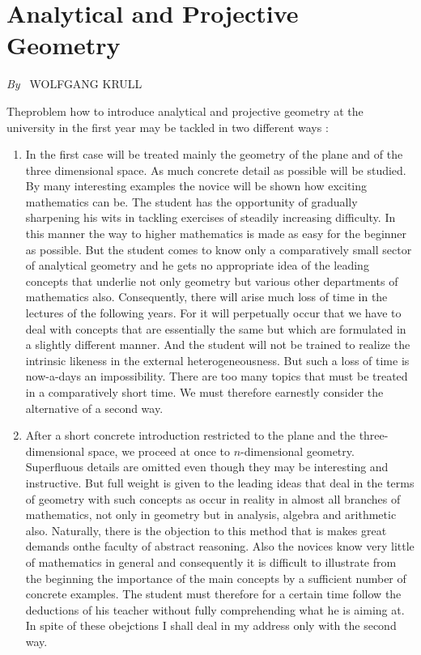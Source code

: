
\chapter{Analytical and Projective Geometry}

\begin{center}
{\em By~} WOLFGANG KRULL
\end{center}

The\pageoriginale problem how to introduce analytical and projective
geometry at the university in the first year may be tackled in two
different ways :
\begin{enumerate}
\item In the first case will be treated mainly the geometry of the
  plane and of the three dimensional space. As much concrete detail as
  possible will be studied. By many interesting examples the novice
  will be shown how exciting mathematics can be. The student has the
  opportunity of gradually sharpening his wits in tackling exercises
  of steadily increasing difficulty. In this manner the way to higher
  mathematics is made as easy for the beginner as possible. But the
  student comes to know only a comparatively small sector of
  analytical geometry and he gets no appropriate idea of the leading
  concepts that underlie not only geometry but various other
  departments of mathematics also. Consequently, there will arise much
  loss of time in the lectures of the following years. For it will
  perpetually occur that we have to deal with concepts that are
  essentially the same but which are formulated in a slightly
  different manner. And the student will not be trained to realize the
  intrinsic likeness in the external heterogeneousness. But such a
  loss of time is now-a-days an impossibility. There are too many
  topics that must be treated in a comparatively short time. We must
  therefore earnestly consider the alternative of a second way.

\item After a short concrete introduction restricted to the plane and
  the three-dimensional space, we proceed at once to $n$-dimensional
  geometry. Superfluous details are omitted even though they may be
  interesting and instructive. But full weight is given to the leading
  ideas that deal in the terms of geometry with such concepts as occur
  in reality in almost all branches of mathematics, not only in
  geometry but in analysis, algebra and arithmetic also. Naturally,
  there is the objection to this method that is makes great demands
  on\pageoriginale the faculty of abstract reasoning. Also the novices
  know very little of mathematics in general and consequently it is
  difficult to illustrate from the beginning the importance of the
  main concepts by a sufficient number of concrete examples. The
  student must therefore for a certain time follow the deductions of
  his teacher without fully comprehending what he is aiming at. In
  spite of these obejctions I shall deal in my address only with the
  second way.
\end{enumerate}


